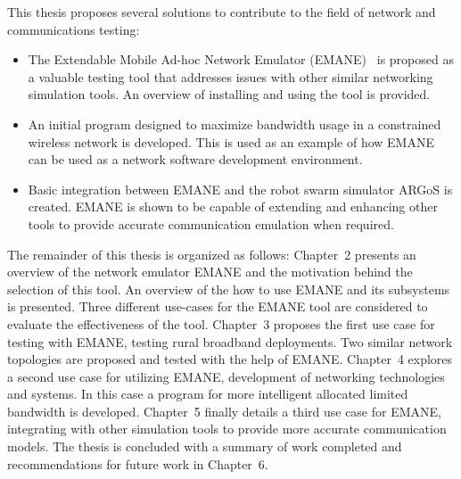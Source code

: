 This thesis proposes several solutions to contribute to the field of network and communications testing:
\begin{itemize}
    \item The Extendable Mobile Ad-hoc Network Emulator (EMANE)~\cite{emane_nrl} is proposed as a valuable testing tool that addresses issues with other similar networking simulation tools. An overview of installing and using the tool is provided.
    \item An initial program designed to maximize bandwidth usage in a constrained wireless network is developed. This is used as an example of how EMANE can be used as a network software development environment.
    \item Basic integration between EMANE and the robot swarm simulator ARGoS is created. EMANE is shown to be capable of extending and enhancing other tools to provide accurate communication emulation when required.
\end{itemize}\par

The remainder of this thesis is organized as follows:
Chapter~2 presents an overview of the network emulator EMANE and the motivation behind the selection of this tool. An overview of the how to use EMANE and its subsystems is presented.
Three different use-cases for the EMANE tool are considered to evaluate the effectiveness of the tool.
Chapter~3 proposes the first use case for testing with EMANE, testing rural broadband deployments. Two similar network topologies are proposed and tested with the help of EMANE.
Chapter~4 explores a second use case for utilizing EMANE, development of networking technologies and systems. In this case a program for more intelligent allocated limited bandwidth is developed.
Chapter~5 finally details a third use case for EMANE, integrating with other simulation tools to provide more accurate communication models.
The thesis is concluded with a summary of work completed and recommendations for future work in Chapter~6.